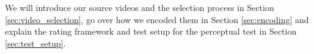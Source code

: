 We will introduce our source videos and the selection process in Section \ref{sec:video_selection}, go over how we encoded them in Section \ref{sec:encoding} and explain the rating framework and test setup for the perceptual test in Section \ref{sec:test_setup}. 
